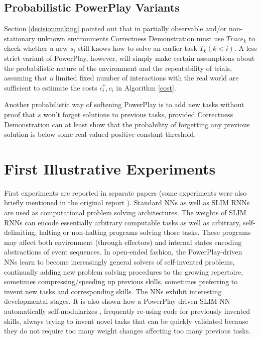 \documentclass{article}
\begin{document}
\subsection{Probabilistic {\sc PowerPlay} Variants}
\label{probabilistic}


Section \ref{decisionmaking} pointed out that in partially observable and/or
non-stationary unknown environments 
{\sc Correctness Demonstration} must use $Trace_k$ to check whether a new $s_i$ still knows
how to solve an earlier task $T_k (k<i)$.
A less strict variant of {\sc PowerPlay}, however, will simply make certain
assumptions about the probabilistic nature of the environment and the repeatability of  trials,
assuming that a limited fixed number of interactions with the real world are sufficient to
estimate the costs $c^*_i, c_i$ in Algorithm \ref{cost}.

Another probabilistic way of softening {\sc PowerPlay} is to add new tasks without proof that $s$ won't forget solutions to previous tasks, provided  {\sc Correctness Demonstration} can at least show that the probability of forgetting any previous solution
 is below some real-valued positive constant threshold.
 

\section{First Illustrative Experiments}
\label{experiments}

First experiments are reported in separate papers \cite{rupesh2012icdl,powerplay2012experiments}
(some experiments were also briefly mentioned in the original report \cite{Schmidhuber:11powerplay}).
Standard NNs as well as
SLIM RNNs  \cite{Schmidhuber:12slimnn}
are used as computational problem solving 
  architectures.  The weights of SLIM RNNs can encode essentially arbitrary computable tasks as well 
as arbitrary, self-delimiting, halting or
  non-halting programs solving those tasks. These programs may affect both environment (through effectors) and
  internal states encoding abstractions of event sequences.  In open-ended
  fashion, the {\sc PowerPlay}-driven NNs learn to become  increasingly
  general solvers of self-invented problems, continually adding new problem solving procedures to
  the growing repertoire, sometimes compressing/speeding up previous skills,
sometimes preferring to invent new tasks and corresponding skills. The NNs exhibit interesting developmental stages.
It is also shown how a {\sc PowerPlay}-driven SLIM NN  automatically self-modularizes \cite{powerplay2012experiments}, 
frequently re-using code for previously invented skills,
always trying to invent novel tasks that can be quickly validated because they do not require too 
many weight changes affecting too many previous tasks.
\end{document}

